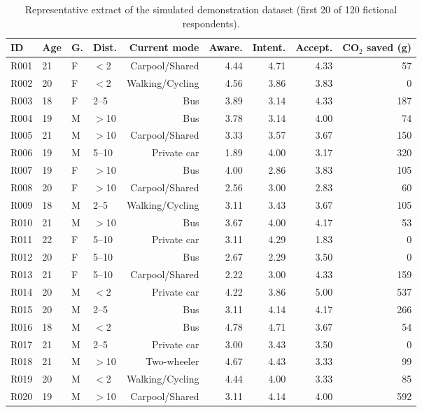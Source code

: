 \documentclass[11pt,a4paper]{article}
\begin{document}
\begin{table}[H]
\centering
\small
\caption{Representative extract of the simulated demonstration dataset (first 20 of 120 fictional
respondents).}
\label{tab:extract}
\begin{tabular}{@{}llllrrrrr@{}}
\toprule
\textbf{ID} & \textbf{Age} & \textbf{G.} & \textbf{Dist.} & \textbf{Current mode} & \textbf{Aware.} & \textbf{Intent.} & \textbf{Accept.} & \textbf{CO$_2$ saved (g)}\\
\midrule
R001 & 21 & F & $<$2 & Carpool/Shared & 4.44 & 4.71 & 4.33 & 57\\
R002 & 20 & F & $<$2 & Walking/Cycling & 4.56 & 3.86 & 3.83 & 0\\
R003 & 18 & F & 2--5 & Bus & 3.89 & 3.14 & 4.33 & 187\\
R004 & 19 & M & $>$10 & Bus & 3.78 & 3.14 & 4.00 & 74\\
R005 & 21 & M & $>$10 & Carpool/Shared & 3.33 & 3.57 & 3.67 & 150\\
R006 & 19 & M & 5--10 & Private car & 1.89 & 4.00 & 3.17 & 320\\
R007 & 19 & F & $>$10 & Bus & 4.00 & 2.86 & 3.83 & 105\\
R008 & 20 & F & $>$10 & Carpool/Shared & 2.56 & 3.00 & 2.83 & 60\\
R009 & 18 & M & 2--5 & Walking/Cycling & 3.11 & 3.43 & 3.67 & 105\\
R010 & 21 & M & $>$10 & Bus & 3.67 & 4.00 & 4.17 & 53\\
R011 & 22 & F & 5--10 & Private car & 3.11 & 4.29 & 1.83 & 0\\
R012 & 20 & F & 5--10 & Bus & 2.67 & 2.29 & 3.50 & 0\\
R013 & 21 & F & 5--10 & Carpool/Shared & 2.22 & 3.00 & 4.33 & 159\\
R014 & 20 & M & $<$2 & Private car & 4.22 & 3.86 & 5.00 & 537\\
R015 & 20 & M & 2--5 & Bus & 3.11 & 4.14 & 4.17 & 266\\
R016 & 18 & M & $<$2 & Bus & 4.78 & 4.71 & 3.67 & 54\\
R017 & 21 & M & 2--5 & Private car & 3.00 & 3.43 & 3.50 & 0\\
R018 & 21 & M & $>$10 & Two-wheeler & 4.67 & 4.43 & 3.33 & 99\\
R019 & 20 & M & $<$2 & Walking/Cycling & 4.44 & 4.00 & 3.33 & 85\\
R020 & 19 & M & $>$10 & Carpool/Shared & 3.11 & 4.14 & 4.00 & 592\\
\bottomrule
\end{tabular}
\end{table}
\end{document}
